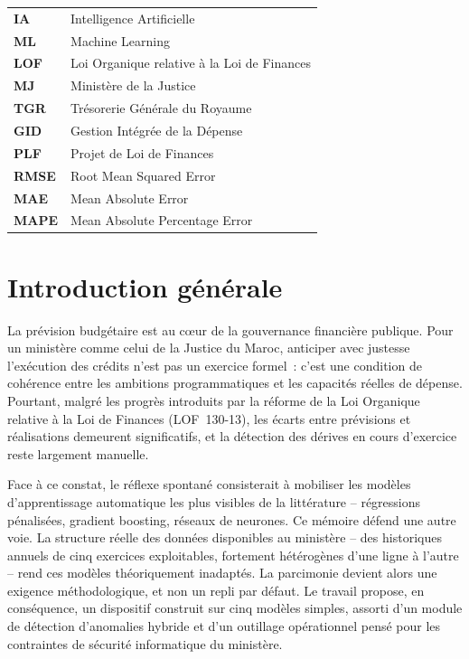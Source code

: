 \documentclass[12pt,a4paper]{article}
\begin{document}
\begin{tabular}{@{}ll@{}}
\textbf{IA}   & Intelligence Artificielle \\
\textbf{ML}   & Machine Learning \\
\textbf{LOF}  & Loi Organique relative \`a la Loi de Finances \\
\textbf{MJ}   & Minist\`ere de la Justice \\
\textbf{TGR}  & Tr\'esorerie G\'en\'erale du Royaume \\
\textbf{GID}  & Gestion Int\'egr\'ee de la D\'epense \\
\textbf{PLF}  & Projet de Loi de Finances \\
\textbf{RMSE} & Root Mean Squared Error \\
\textbf{MAE}  & Mean Absolute Error \\
\textbf{MAPE} & Mean Absolute Percentage Error \\
\end{tabular}

\newpage

\section*{Introduction g\'en\'erale}

La pr\'evision budg\'etaire est au c\oe{}ur de la gouvernance financi\`ere publique. Pour un minist\`ere comme celui de la Justice du Maroc, anticiper avec justesse l'ex\'ecution des cr\'edits n'est pas un exercice formel~: c'est une condition de coh\'erence entre les ambitions programmatiques et les capacit\'es r\'eelles de d\'epense. Pourtant, malgr\'e les progr\`es introduits par la r\'eforme de la Loi Organique relative \`a la Loi de Finances (LOF~130-13), les \'ecarts entre pr\'evisions et r\'ealisations demeurent significatifs, et la d\'etection des d\'erives en cours d'exercice reste largement manuelle.

Face \`a ce constat, le r\'eflexe spontan\'e consisterait \`a mobiliser les mod\`eles d'apprentissage automatique les plus visibles de la litt\'erature -- r\'egressions p\'enalis\'ees, gradient boosting, r\'eseaux de neurones. Ce m\'emoire d\'efend une autre voie. La structure r\'eelle des donn\'ees disponibles au minist\`ere -- des historiques annuels de cinq exercices exploitables, fortement h\'et\'erog\`enes d'une ligne \`a l'autre -- rend ces mod\`eles th\'eoriquement inadapt\'es. La parcimonie devient alors une exigence m\'ethodologique, et non un repli par d\'efaut. Le travail propose, en cons\'equence, un dispositif construit sur cinq mod\`eles simples, assorti d'un module de d\'etection d'anomalies hybride et d'un outillage op\'erationnel pens\'e pour les contraintes de s\'ecurit\'e informatique du minist\`ere.
\end{document}
